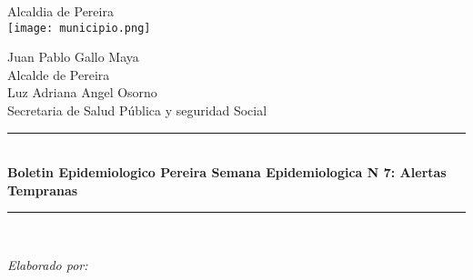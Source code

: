 \begin{titlepage} %
	\newcommand{\HRule}{\rule{\linewidth}{0.5mm}} %
	
	\center %
	
	
	\LARGE Alcaldia de Pereira\\[1cm] %

\vfill\vfill
	\texttt{[image: municipio.png]}\\[0.5cm] %
	 
	
	\vfill %

	\Large Juan Pablo Gallo Maya \\[0.5cm] %
	Alcalde de Pereira \\[0.5cm]
	
	\large Luz Adriana Angel Osorno \\[0.5cm] %
	Secretaria de Salud Pública y seguridad Social \\[1cm]
	
	
	\HRule\\[1cm]
	
	{\huge\bfseries Boletin Epidemiologico Pereira Semana Epidemiologica N 7: Alertas Tempranas }\\[0.3cm] %
	
	\HRule\\[1cm]
	
	
	\begin{minipage}{0.5\textwidth}
		\begin{flushleft}
			\large
			\textit{Elaborado por:}\\
			

\end{flushleft}
\end{minipage}
\end{titlepage}

